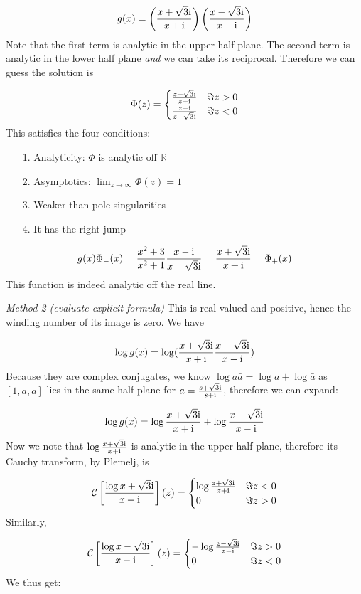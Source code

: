 \documentclass[12pt,a4paper]{article}
\def\I{ {\rm i} }
\def\R{ {\mathbb R} }
\def\CC{ {\cal C} }
\def\br[#1]{\left[{#1}\right]}
\begin{document}
\[
g(x) = \left({x+\sqrt{3} \I \over x+\I}\right)\left({ x-\sqrt{3} \I \over  x-\I}\right)
\]
Note that the first term is analytic in  the upper half plane. The second term is analytic in the lower half plane \emph{and} we can take its reciprocal. Therefore we can guess the solution is

\[
\Phi(z)  = \begin{cases}
        {z+\sqrt 3\I \over z+\I} & \Im z > 0 \\
            {z-\I \over z-\sqrt 3\I} & \Im z < 0
           \end{cases}
\]
This satisfies the four conditions:

\begin{itemize}
\item[1. ] Analyticity: $\Phi$ is analytic off $\R$


\item[2. ] Asymptotics: $\lim_{z\rightarrow \infty}\Phi(z) = 1$


\item[3. ] Weaker than pole singularities


\item[4. ] It has the right jump

\end{itemize}
\[
g(x) \Phi_-(x) =  {x^2+3 \over x^2+1} {x-\I \over x-\sqrt 3\I}  = {x+\sqrt 3 \I\over x+\I} = \Phi_+(x)
\]
This function is indeed analytic off the real line.

\emph{Method 2 (evaluate explicit formula)} This is real valued and positive, hence the winding number of its image is zero.  We have

\[
\log g(x) = \log({x+\sqrt 3\I \over x+\I}{x-\sqrt 3\I \over x-\I})
\]
Because they are complex conjugates, we know $\log a \bar a = \log a + \log \bar a$ as $[1, \bar a, a]$ lies in the same half plane for $a = {s+\sqrt 3 \I \over s+ \I}$, therefore we can expand:

\[
\log g(x) = \log{x+\sqrt 3\I \over x+\I} + \log {x-\sqrt 3\I \over x-\I}
\]
Now we note that $\log{x+\sqrt 3\I \over x+\I}$ is analytic in the upper-half plane, therefore its Cauchy transform, by Plemelj, is

\[
\CC\br[\log{x+\sqrt 3\I \over x+\I}](z) = \begin{cases}
        \log{z+\sqrt 3\I \over z+\I} & \Im z < 0 \\
           0 & \Im z > 0
           \end{cases}
\]
Similarly,

\[
\CC\br[\log{x-\sqrt 3\I \over x-\I}](z) = \begin{cases}
        -\log{z-\sqrt 3\I \over z-\I} & \Im z > 0 \\
           0 & \Im z < 0
           \end{cases}
\]
We thus get:
\end{document}
